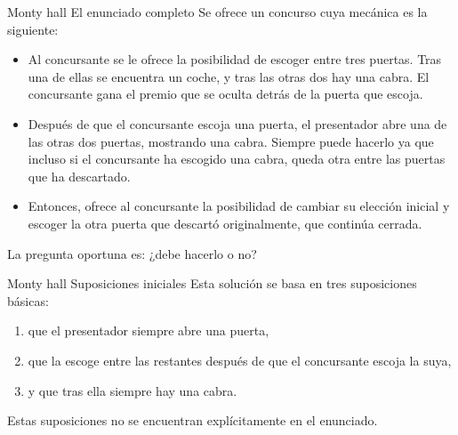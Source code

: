\documentclass[11pt]{beamer}
\begin{document}
\begin{frame}{Monty hall El enunciado completo }
Se ofrece un concurso cuya mecánica es la siguiente:
\begin{itemize}
\item Al concursante se le ofrece la posibilidad de escoger entre tres puertas. Tras una de ellas se encuentra un coche, y tras las otras dos hay una cabra. El concursante gana el premio que se oculta detrás de la puerta que escoja.
\item Después de que el concursante escoja una puerta, el presentador abre una de las otras dos puertas, mostrando una cabra. Siempre puede hacerlo ya que incluso si el concursante ha escogido una cabra, queda otra entre las puertas que ha descartado.
\item Entonces, ofrece al concursante la posibilidad de cambiar su elección inicial y escoger la otra puerta que descartó originalmente, que continúa cerrada. 
\end{itemize}
\bigskip
La pregunta oportuna es: ¿debe hacerlo o no?

\end{frame}
\begin{frame}{Monty hall  Suposiciones iniciales}
Esta solución se basa en tres suposiciones básicas:
\begin{enumerate}
\item que el presentador siempre abre una puerta, 
\item que la escoge entre las restantes después de que el concursante escoja la suya,
\item y que tras ella siempre hay una cabra.
\end{enumerate}
\bigskip Estas suposiciones no se encuentran explícitamente en el enunciado.
\end{frame}
\end{document}
